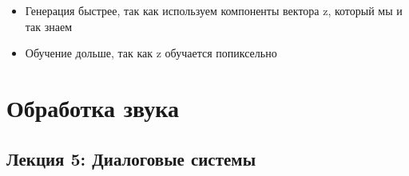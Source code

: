\documentclass[a4paper, 12pt]{article}
\begin{document}
\begin{itemize}
\item
  
  Генерация быстрее, так как используем компоненты вектора z, который мы
  и так знаем
  
\item
  
  Обучение дольше, так как z обучается попиксельно
  
\end{itemize}

\section{Обработка звука}

\subsection{Лекция 5: Диалоговые системы}
\end{document}
